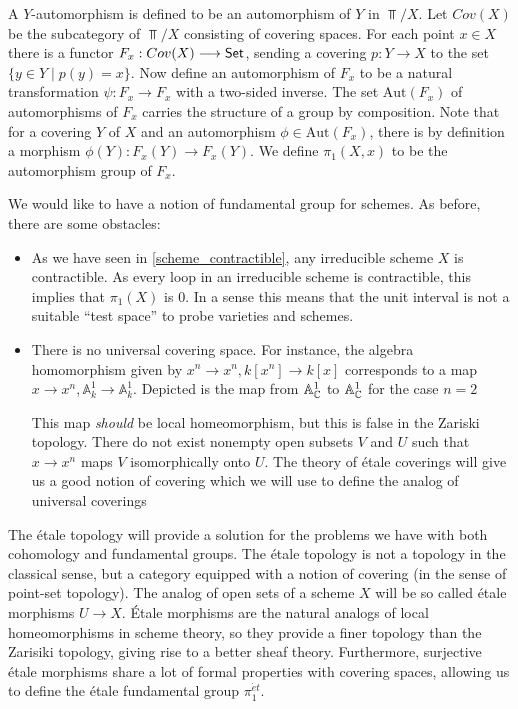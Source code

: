 A $Y$-automorphism is defined to be an automorphism of $Y$ in $\Top/X$. Let $Cov(X)$ be the subcategory of $\Top/X$ consisting of covering spaces. For each point $x \in X$ there is a functor $F_x: Cov(X) \longrightarrow \mathsf{Set}$, sending a covering $p: Y \to X$ to the set $\{y \in Y \mid p(y) = x\}$. Now define an automorphism of $F_x$ to be a natural transformation $\psi: F_x \to F_x$ with a two-sided inverse. The set $\text{Aut}(F_x)$ of automorphisms of $F_x$ carries the structure of a group by composition. Note that for a covering $Y$ of $X$ and an automorphism $\phi \in \text{Aut}(F_x)$, there is by definition a morphism $\phi(Y): F_x(Y) \to F_x(Y)$. We define $\pi_1(X,x)$ to be the automorphism group of $F_x$.

We would like to have a notion of fundamental group for schemes. As before, there are some obstacles:

\begin{itemize}
  \item  As we have seen in \ref{scheme_contractible}, any irreducible scheme $X$ is contractible. As every loop in an irreducible scheme is contractible, this implies that $\pi_1(X)$ is $0$. In a sense this means that the unit interval is not a suitable ``test space'' to probe varieties and schemes.
  \item There is no universal covering space.
        For instance, the algebra homomorphism given by $x^n \to x^n, k[x^n] \to k[x]$ corresponds to a map $x \to x^n, \mathbb{A}^1_k \to \mathbb{A}^1_k$. Depicted is the map from $\mathbb{A}^1_{\mathbb{C}}$ to $\mathbb{A}^1_{\mathbb{C}}$ for the case $n=2$

        
        This map \textit{should} be local homeomorphism, but this is false in the Zariski topology. There do not exist nonempty open subsets $V$ and $U$ such that $x \to x^n$ maps $V$ isomorphically onto $U$. The theory of \'etale coverings will give us a good notion of covering which we will use to define the analog of universal coverings
\end{itemize}

The \'etale topology will provide a solution for the problems we have with both cohomology and fundamental groups. The \'etale topology is not a topology in the classical sense, but a category equipped with a notion of covering (in the sense of point-set topology). The analog of open sets of a scheme $X$ will be so called \'etale morphisms $U \to X$. \'Etale morphisms are the natural analogs of local homeomorphisms in scheme theory, so they provide a finer topology than the Zarisiki topology, giving rise to a better sheaf theory. Furthermore, surjective \'etale morphisms share a lot of formal properties with covering spaces, allowing us to define the \'etale fundamental group $\pi_1^{\acute{e}t}$.


